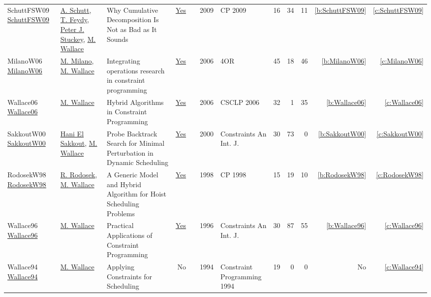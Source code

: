 {\begin{longtable}{>{\raggedright\arraybackslash}p{3cm}>{\raggedright\arraybackslash}p{6cm}>{\raggedright\arraybackslash}p{6.5cm}rrrp{2.5cm}rrrrr}
SchuttFSW09 \href{https://doi.org/10.1007/978-3-642-04244-7\_58}{SchuttFSW09} & \hyperref[auth:a125]{A. Schutt}, \hyperref[auth:a155]{T. Feydy}, \hyperref[auth:a126]{Peter J. Stuckey}, \hyperref[auth:a117]{M. Wallace} & Why Cumulative Decomposition Is Not as Bad as It Sounds & \href{../works/SchuttFSW09.pdf}{Yes} & \cite{SchuttFSW09} & 2009 & CP 2009 & 16 & 34 & 11 & \ref{b:SchuttFSW09} & \ref{c:SchuttFSW09}\\
MilanoW06 \href{http://dx.doi.org/10.1007/s10288-006-0019-z}{MilanoW06} & \hyperref[auth:a144]{M. Milano}, \hyperref[auth:a117]{M. Wallace} & Integrating operations research in constraint programming & \href{../works/MilanoW06.pdf}{Yes} & \cite{MilanoW06} & 2006 & 4OR & 45 & 18 & 46 & \ref{b:MilanoW06} & \ref{c:MilanoW06}\\
Wallace06 \href{http://dx.doi.org/10.1007/978-3-540-73817-6_1}{Wallace06} & \hyperref[auth:a117]{M. Wallace} & Hybrid Algorithms in Constraint Programming & \href{../works/Wallace06.pdf}{Yes} & \cite{Wallace06} & 2006 & CSCLP 2006 & 32 & 1 & 35 & \ref{b:Wallace06} & \ref{c:Wallace06}\\
SakkoutW00 \href{https://doi.org/10.1023/A:1009856210543}{SakkoutW00} & \hyperref[auth:a168]{Hani El Sakkout}, \hyperref[auth:a117]{M. Wallace} & Probe Backtrack Search for Minimal Perturbation in Dynamic Scheduling & \href{../works/SakkoutW00.pdf}{Yes} & \cite{SakkoutW00} & 2000 & Constraints An Int. J. & 30 & 73 & 0 & \ref{b:SakkoutW00} & \ref{c:SakkoutW00}\\
RodosekW98 \href{https://doi.org/10.1007/3-540-49481-2\_28}{RodosekW98} & \hyperref[auth:a300]{R. Rodosek}, \hyperref[auth:a117]{M. Wallace} & A Generic Model and Hybrid Algorithm for Hoist Scheduling Problems & \href{../works/RodosekW98.pdf}{Yes} & \cite{RodosekW98} & 1998 & CP 1998 & 15 & 19 & 10 & \ref{b:RodosekW98} & \ref{c:RodosekW98}\\
Wallace96 \href{https://doi.org/10.1007/BF00143881}{Wallace96} & \hyperref[auth:a117]{M. Wallace} & Practical Applications of Constraint Programming & \href{../works/Wallace96.pdf}{Yes} & \cite{Wallace96} & 1996 & Constraints An Int. J. & 30 & 87 & 55 & \ref{b:Wallace96} & \ref{c:Wallace96}\\
Wallace94 \href{}{Wallace94} & \hyperref[auth:a117]{M. Wallace} & Applying Constraints for Scheduling & No & \cite{Wallace94} & 1994 & Constraint Programming 1994 & 19 & 0 & 0 & No & \ref{c:Wallace94}\\
\end{longtable}
}

